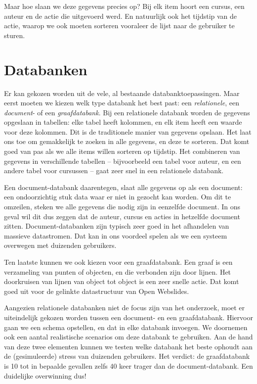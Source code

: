 \documentclass[twoside,twocolumn]{article}
\begin{document}
Maar hoe slaan we deze gegevens precies op?
Bij elk item hoort een cursus, een auteur en de actie die uitgevoerd werd.
En natuurlijk ook het tijdstip van de actie, waarop we ook moeten sorteren vooraleer de lijst naar de gebruiker te sturen.

\section*{Databanken}

Er kan gekozen worden uit de vele, al bestaande databanktoepassingen.
Maar eerst moeten we kiezen welk type databank het best past: een \textit{relationele}, een \textit{document}- of een \textit{graafdatabank}.
Bij een relationele databank worden de gegevens opgeslaan in tabellen: elke tabel heeft kolommen, en elk item heeft een waarde voor deze kolommen.
Dit is de traditionele manier van gegevens opslaan.
Het laat ons toe om gemakkelijk te zoeken in alle gegevens, en deze te sorteren.
Dat komt goed van pas als we alle items willen sorteren op tijdstip.
Het combineren van gegevens in verschillende tabellen -- bijvoorbeeld een tabel voor auteur, en een andere tabel voor cursussen -- gaat zeer snel in een relationele databank.

Een document-databank daarentegen, slaat alle gegevens op als een document: een ondoorzichtig stuk data waar er niet in gezocht kan worden.
Om dit te omzeilen, steken we alle gegevens die nodig zijn in eenzelfde document.
In ons geval wil dit dus zeggen dat de auteur, cursus en acties in hetzelfde document zitten.
Document-databanken zijn typisch zeer goed in het afhandelen van massieve datastromen. 
Dat kan in ons voordeel spelen als we een systeem overwegen met duizenden gebruikers.

Ten laatste kunnen we ook kiezen voor een graafdatabank.
Een graaf is een verzameling van punten of objecten, en die verbonden zijn door lijnen.
Het doorkruisen van lijnen van object tot object is een zeer snelle actie.
Dat komt goed uit voor de gelinkte datastructuur van Open Webslides.



Aangezien relationele databanken niet de focus zijn van het onderzoek, moet er uiteindelijk gekozen worden tussen een document- en een graafdatabank.
Hiervoor gaan we een schema opstellen, en dat in elke databank invoegen.
We doornemen ook een aantal realistische scenarios om deze databank te gebruiken.
Aan de hand van deze twee elementen kunnen we testen welke databank het beste ophoudt aan de (gesimuleerde) stress van duizenden gebruikers.
Het verdict: de graafdatabank is 10 tot in bepaalde gevallen zelfs 40 keer trager dan de document-databank.
Een duidelijke overwinning dus!
\end{document}
